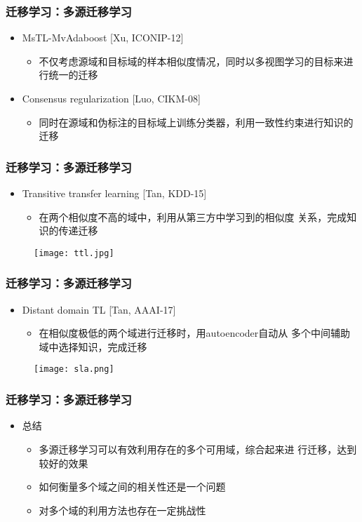 \begin{frame}
    \frametitle{迁移学习：多源迁移学习}
    \begin{itemize}
        \item MsTL-MvAdaboost [Xu, ICONIP-12]
            \begin{itemize}
                \item 不仅考虑源域和目标域的样本相似度情况，同时以多视图学习的目标来进行统一的迁移
            \end{itemize}
        \item Consensus regularization [Luo, CIKM-08]
            \begin{itemize}
                \item 同时在源域和伪标注的目标域上训练分类器，利用一致性约束进行知识的迁移
            \end{itemize}
    \end{itemize}
\end{frame}

\begin{frame}
    \frametitle{迁移学习：多源迁移学习}
    \begin{itemize}
        \item Transitive transfer learning [Tan, KDD-15]
            \begin{itemize}
                \item 在两个相似度不高的域中，利用从第三方中学习到的相似度
                关系，完成知识的传递迁移
            \end{itemize}
    \end{itemize}
    \begin{figure}
        \texttt{[image: ttl.jpg]}
    \end{figure}
\end{frame}

\begin{frame}
    \frametitle{迁移学习：多源迁移学习}
    \begin{itemize}
        \item Distant domain TL [Tan, AAAI-17]
            \begin{itemize}
                \item 在相似度极低的两个域进行迁移时，用autoencoder自动从
                多个中间辅助域中选择知识，完成迁移
            \end{itemize}
    \end{itemize}
    \begin{figure}
        \texttt{[image: sla.png]}
    \end{figure}
\end{frame}

\begin{frame}
    \frametitle{迁移学习：多源迁移学习}
    \begin{itemize}
        \item 总结
        \begin{itemize}
            \item 多源迁移学习可以有效利用存在的多个可用域，综合起来进
            行迁移，达到较好的效果
            \item 如何衡量多个域之间的相关性还是一个问题
            \item 对多个域的利用方法也存在一定挑战性
        \end{itemize}
    \end{itemize}
\end{frame}